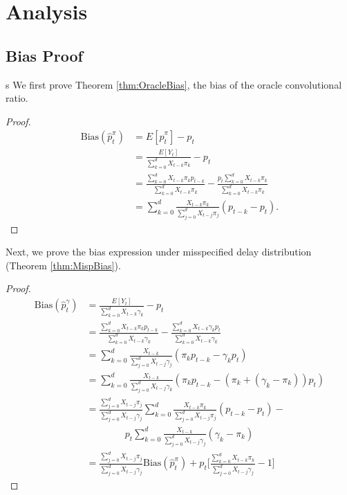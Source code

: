 \documentclass{article}
\begin{document}
\pagebreak
\appendix
\section{Analysis}

\subsection{Bias Proof}s\label{apx:proofs}
We first prove Theorem \ref{thm:OracleBias}, the bias of the oracle convolutional ratio. 
\begin{proof}
    \begin{align*}%
    \text{Bias}(\hat{p}_t^\pi) &= E[\hat{p}_t^\pi] - p_t \\
    &= \frac{E[Y_t]}{\sum_{k=0}^d X_{t-k}\pi_k} - p_t \\ 
    &= \frac{\sum_{k=0}^d X_{t-k}\pi_k p_{t-k}}{\sum_{k=0}^d X_{t-k}\pi_k} - \frac{p_t \sum_{k=0}^d X_{t-k}\pi_k}{\sum_{k=0}^d X_{t-k}\pi_k}\\
    &= \sum_{k=0}^d \frac{X_{t-k}\pi_k}{\sum_{j=0}^d X_{t-j}\pi_j} (p_{t-k}-p_t).
\end{align*}
\end{proof}

Next, we prove the bias expression under misspecified delay distribution (Theorem \ref{thm:MispBias}). 
\begin{proof}
    \begin{align*}
    \text{Bias}(\hat{p}_t^\gamma) &= \frac{E[Y_t]}{\sum_{k=0}^d X_{t-k}\gamma_k} - p_t \\
    &= \frac{\sum_{k=0}^d X_{t-k}\pi_k p_{t-k}}{\sum_{k=0}^d X_{t-k}\gamma_k} - \frac{\sum_{k=0}^d X_{t-k}\gamma_k p_t}{\sum_{k=0}^d X_{t-k}\gamma_k} \\
    &= \sum_{k=0}^d \frac{X_{t-k}}{\sum_{j=0}^d X_{t-j}\gamma_j}(\pi_k p_{t-k}-\gamma_k p_t) \\
    &= \sum_{k=0}^d \frac{X_{t-k}}{\sum_{j=0}^d X_{t-j}\gamma_k}(\pi_k p_{t-k}-(\pi_k +(\gamma_k-\pi_k)) p_t) \\
     &= \frac{\sum_{j=0}^d X_{t-j}\pi_j}{\sum_{j=0}^d X_{t-j}\gamma_j}\sum_{k=0}^d \frac{X_{t-k}\pi_k}{\sum_{j=0}^d X_{t-j}\pi_j}(p_{t-k}-p_t) -\\
     &\qquad\qquad p_t\sum_{k=0}^d \frac{X_{t-k}}{\sum_{j=0}^d X_{t-j}\gamma_j}(\gamma_k -\pi_k)  \\
     &= \frac{\sum_{j=0}^d X_{t-j}\pi_j}{\sum_{j=0}^d X_{t-j}\gamma_j}\text{Bias}(\hat{p}_t^\pi) + p_t\Big[ \frac{\sum_{k=0}^d X_{t-k}\pi_k}{\sum_{j=0}^d X_{t-j}\gamma_j}-1\Big]
\end{align*}
\end{proof}
\end{document}
